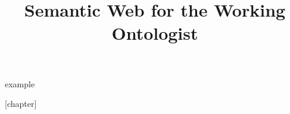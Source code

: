 \documentclass[times]{acm-book}%
\title{Semantic Web for the Working Ontologist}
\begin{document}
\newenvironment{challenge}[1][]{\refstepcounter{challenge}\par\medskip
   \textbf{CHALLENGE \thechallenge} \rmfamily}{\medskip}

\newenvironment{solution}[1][]{\textbf{SOLUTION}}


\newcounter{example}
\newenvironment{example}[1][]{\refstepcounter{example}\par\medskip
   \textbf{Example~\theexample. #1} \rmfamily}{\medskip}


[chapter]
\newenvironment{query}[1][]{\refstepcounter{query}\par\medskip
   \textbf{Query~\thechapter.\thequery. #1} \rmfamily}{\medskip}



\frontmatter

\mainmatter





 











\backmatter

\end{document}
